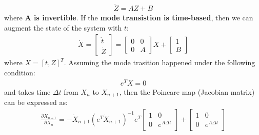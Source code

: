 \begin{align}
\dot Z = AZ +B
\end{align}
where \textbf{A is invertible}. If the \textbf{mode transistion  is time-based}, then we can augment the state of the system with $t$:
\begin{align}
\label{eq:AtEOM}
\dot X = 
\begin{bmatrix}
\dot t  \\
\dot Z
\end{bmatrix} = \begin{bmatrix}
0 & 0 \\
0 & A
\end{bmatrix}X + \begin{bmatrix}
1\\%
B 
\end{bmatrix}
\end{align}
where $X = [t,Z]^T$. Assuming the mode trasition happened under the following condition:
\begin{align}
e^T X = 0
\end{align}
and takes time $\Delta t$ from $X_n$ to $X_{n+1}$, then the Poincare map (Jacobian matrix) can be expressed as:
\begin{align}
\frac{\partial  X_{n+1}}{\partial  X_{n}} = -\dot X_{n+1}(e^T\dot X_{n+1})^{-1} e^T\begin{bmatrix}
1 & 0 \\
0 & e^{A\Delta t}
\end{bmatrix} + 
\begin{bmatrix}
1 & 0 \\
0 & e^{A\Delta t}
\end{bmatrix}
\end{align}




\pagebreak